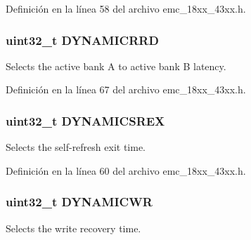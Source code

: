 Definición en la línea 58 del archivo emc\+\_\+18xx\+\_\+43xx.\+h.

\subsubsection[{\texorpdfstring{D\+Y\+N\+A\+M\+I\+C\+R\+RD}{DYNAMICRRD}}]{ uint32\+\_\+t D\+Y\+N\+A\+M\+I\+C\+R\+RD}\hypertarget{struct_l_p_c___e_m_c___t_a76ddb942c52534dd4c94c997e7d9cff6}{}\label{struct_l_p_c___e_m_c___t_a76ddb942c52534dd4c94c997e7d9cff6}
Selects the active bank A to active bank B latency. 

Definición en la línea 67 del archivo emc\+\_\+18xx\+\_\+43xx.\+h.

\subsubsection[{\texorpdfstring{D\+Y\+N\+A\+M\+I\+C\+S\+R\+EX}{DYNAMICSREX}}]{ uint32\+\_\+t D\+Y\+N\+A\+M\+I\+C\+S\+R\+EX}\hypertarget{struct_l_p_c___e_m_c___t_a76efe97843895351343471fb3178ebe4}{}\label{struct_l_p_c___e_m_c___t_a76efe97843895351343471fb3178ebe4}
Selects the self-\/refresh exit time. 

Definición en la línea 60 del archivo emc\+\_\+18xx\+\_\+43xx.\+h.

\subsubsection[{\texorpdfstring{D\+Y\+N\+A\+M\+I\+C\+WR}{DYNAMICWR}}]{ uint32\+\_\+t D\+Y\+N\+A\+M\+I\+C\+WR}\hypertarget{struct_l_p_c___e_m_c___t_a5633b3f06d019a2aa88d752dba1bfef2}{}\label{struct_l_p_c___e_m_c___t_a5633b3f06d019a2aa88d752dba1bfef2}
Selects the write recovery time. 

